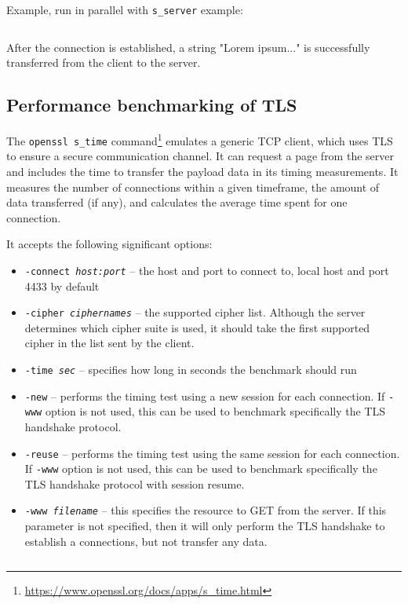 Example, run in parallel with \texttt{s\_server} example:

\inputminted{text}{code/openssl-s_client-example.txt}

After the connection is established, a string "Lorem ipsum..." is successfully transferred from the client to the server.


\subsection{Performance benchmarking of TLS}

The \texttt{openssl s\_time} command\footnote{\url{https://www.openssl.org/docs/apps/s\_time.html}} emulates a generic TCP client, which uses TLS to ensure a secure communication channel. It can request a page from the server and includes the time to transfer the payload data in its timing measurements. It measures the number of connections within a given timeframe, the amount of data transferred (if any), and calculates the average time spent for one connection.

It accepts the following significant options:

\begin{itemize}
  \item \texttt{-connect \textit{host:port}} -- the host and port to connect to, local host and port 4433 by default
  \item \texttt{-cipher \textit{ciphernames}} -- the supported cipher list. Although the server determines which cipher suite is used, it should take the first supported cipher in the list sent by the client.
  \item \texttt{-time \textit{sec}} -- specifies how long in seconds the benchmark should run
  \item \texttt{-new} -- performs the timing test using a new session for each connection. If \texttt{-www} option is not used, this can be used to benchmark specifically the TLS handshake protocol.
  \item \texttt{-reuse} -- performs the timing test using the same session for each connection. If \texttt{-www} option is not used, this can be used to benchmark specifically the TLS handshake protocol with session resume.
  \item \texttt{-www \textit{filename}} -- this specifies the resource to GET from the server. If this parameter is not specified, then it will only perform the TLS handshake to establish a connections, but not transfer any data.
\end{itemize}

\inputminted{text}{code/openssl-s_time-example.txt}

